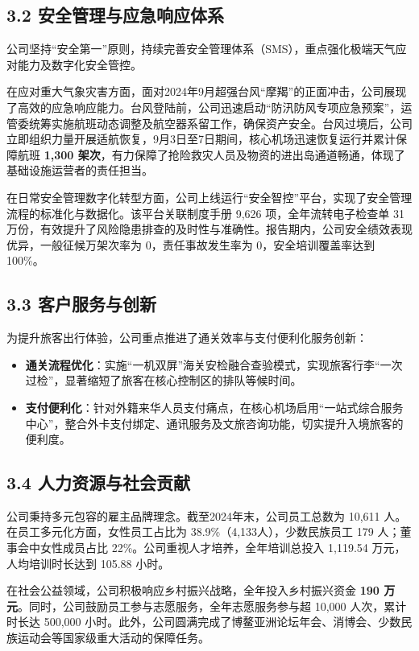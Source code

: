 \documentclass[a4paper,12pt]{article}
\begin{document}
\subsection{3.2 安全管理与应急响应体系}

公司坚持“安全第一”原则，持续完善安全管理体系（SMS），重点强化极端天气应对能力及数字化安全管控。

在应对重大气象灾害方面，面对2024年9月超强台风“摩羯”的正面冲击，公司展现了高效的应急响应能力。台风登陆前，公司迅速启动“防汛防风专项应急预案”，运管委统筹实施航班动态调整及航空器系留工作，确保资产安全。台风过境后，公司立即组织力量开展适航恢复，9月3日至7日期间，核心机场迅速恢复运行并累计保障航班 \textbf{1,300 架次}，有力保障了抢险救灾人员及物资的进出岛通道畅通，体现了基础设施运营者的责任担当。

在日常安全管理数字化转型方面，公司上线运行“安全智控”平台，实现了安全管理流程的标准化与数据化。该平台关联制度手册 9,626 项，全年流转电子检查单 31 万份，有效提升了风险隐患排查的及时性与准确性。报告期内，公司安全绩效表现优异，一般征候万架次率为 0，责任事故发生率为 0，安全培训覆盖率达到 100\%。

\subsection{3.3 客户服务与创新}

为提升旅客出行体验，公司重点推进了通关效率与支付便利化服务创新：
\begin{itemize}
    \item \textbf{通关流程优化}：实施“一机双屏”海关安检融合查验模式，实现旅客行李“一次过检”，显著缩短了旅客在核心控制区的排队等候时间。
    \item \textbf{支付便利化}：针对外籍来华人员支付痛点，在核心机场启用“一站式综合服务中心”，整合外卡支付绑定、通讯服务及文旅咨询功能，切实提升入境旅客的便利度。
\end{itemize}

\subsection{3.4 人力资源与社会贡献}

公司秉持多元包容的雇主品牌理念。截至2024年末，公司员工总数为 10,611 人。在员工多元化方面，女性员工占比为 38.9\%（4,133人），少数民族员工 179 人；董事会中女性成员占比 22\%。公司重视人才培养，全年培训总投入 1,119.54 万元，人均培训时长达到 105.88 小时。

在社会公益领域，公司积极响应乡村振兴战略，全年投入乡村振兴资金 \textbf{190 万元}。同时，公司鼓励员工参与志愿服务，全年志愿服务参与超 10,000 人次，累计时长达 500,000 小时。此外，公司圆满完成了博鳌亚洲论坛年会、消博会、少数民族运动会等国家级重大活动的保障任务。
\end{document}
